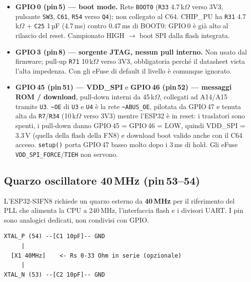 \documentclass[12pt, a4paper]{article}
\begin{document}
\begin{itemize}
  \item \textbf{GPIO\,0 (pin\,5) --- boot mode.} Rete \texttt{BOOT0} (\texttt{R33} 4.7\,k$\Omega$ verso 3V3, pulsante \texttt{SW3}, \texttt{C61}, \texttt{R54} verso \texttt{Q4}); non collegato al C64. CHIP\_PU ha \texttt{R31} 4.7\,k$\Omega$ + \texttt{C25} 1\,µF (4.7\,ms) contro 0.47\,ms di BOOT0: GPIO\,0 è già alto al rilascio del reset. Campionato HIGH $\rightarrow$ boot SPI dalla flash integrata.
  \item \textbf{GPIO\,3 (pin\,8) --- sorgente JTAG, nessun pull interno.} Non usato dal firmware; pull-up \texttt{R71} 10\,k$\Omega$ verso 3V3, obbligatoria perché il datasheet vieta l'alta impedenza. Con gli eFuse di default il livello è comunque ignorato.
  \item \textbf{GPIO\,45 (pin\,51) --- VDD\_SPI} e \textbf{GPIO\,46 (pin\,52) --- messaggi ROM / download}, pull-down interni da 45\,k$\Omega$, collegati ad A14/A15 tramite \texttt{U3}. \texttt{\textasciitilde OE} di \texttt{U3} e \texttt{U4} è la rete \texttt{\textasciitilde ABUS\_OE}, pilotata da GPIO\,47 e tenuta alta da \texttt{R7}/\texttt{R34} (10\,k$\Omega$ verso 3V3) mentre l'ESP32 è in reset: i traslatori sono spenti, i pull-down danno GPIO\,45 = GPIO\,46 = LOW, quindi VDD\_SPI = 3.3\,V (quella della flash della FN8) e download boot valido anche con il C64 acceso. \texttt{setup()} porta GPIO\,47 basso molto dopo i 3\,ms di hold. Gli eFuse \texttt{VDD\_SPI\_FORCE}/\texttt{TIEH} non servono.
\end{itemize}

\subsection{Quarzo oscillatore 40\,MHz (pin\,53--54)}
\label{sec:xtal}

L'ESP32-S3FN8 richiede un quarzo esterno da \textbf{40\,MHz} per il riferimento del PLL che alimenta la CPU a 240\,MHz, l'interfaccia flash e i divisori UART. I pin sono analogici dedicati, non condivisi con GPIO.

\begin{center}
\begin{BVerbatim}
XTAL_P (54) --[C1 10pF]-- GND
     |
  [X1 40MHz]    <- Rs 0-33 Ohm in serie (opzionale)
     |
XTAL_N (53) --[C2 10pF]-- GND
\end{BVerbatim}
\end{center}

\begin{center}
\end{center}
\end{document}
